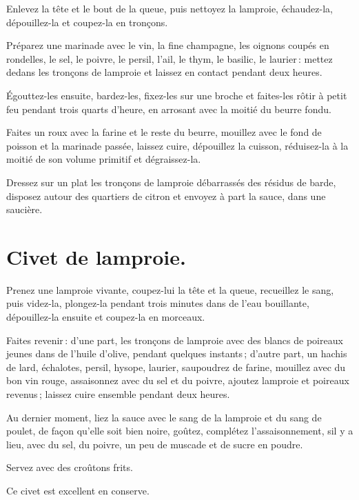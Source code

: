 \normalsize

Enlevez la tête et le bout de la queue, puis nettoyez la lamproie, échaudez-la,
dépouillez-la et coupez-la en tronçons.

Préparez une marinade avec le vin, la fine champagne, les oignons coupés en
rondelles, le sel, le poivre, le persil, l'ail, le thym, le basilic, le
laurier : mettez dedans les tronçons de lamproie et laissez en contact pendant
deux heures.

Égouttez-les ensuite, bardez-les, fixez-les sur une broche et faites-les rôtir
à petit feu pendant trois quarts d'heure, en arrosant avec la moitié du beurre
fondu.

Faites un roux avec la farine et le reste du beurre, mouillez avec le fond de
poisson et la marinade passée, laissez cuire, dépouillez la cuisson,
réduisez-la à la moitié de son volume primitif et dégraissez-la.

Dressez sur un plat les tronçons de lamproie débarrassés des résidus de barde,
disposez autour des quartiers de citron et envoyez à part la sauce, dans une
saucière.

\section*{\centering Civet de lamproie.}
\label{pg0341} \hypertarget{p0341}{}

Prenez une lamproie vivante, coupez-lui la tête et la queue, recueillez le
sang, puis videz-la, plongez-la pendant trois minutes dans de l'eau bouillante,
dépouillez-la ensuite et coupez-la en morceaux.

Faites revenir : d'une part, les tronçons de lamproie avec des blancs de
poireaux jeunes dans de l'huile d'olive, pendant quelques instants ; d'autre
part, un hachis de lard, échalotes, persil, hysope, laurier, saupoudrez de
farine, mouillez avec du bon vin rouge, assaisonnez avec du sel et du poivre,
ajoutez lamproie et poireaux revenus ; laissez cuire ensemble pendant deux
heures.

Au dernier moment, liez la sauce avec le sang de la lamproie et du sang de
poulet, de façon qu'elle soit bien noire, goûtez, complétez l'assaisonnement,
sil y a lieu, avec du sel, du poivre, un peu de muscade et de sucre en poudre.

Servez avec des croûtons frits.

\sk

Ce civet est excellent en conserve.

